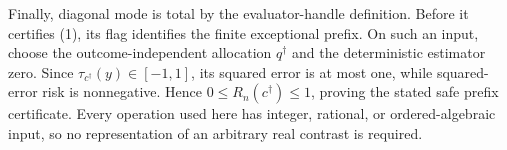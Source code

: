 Finally, diagonal mode is total by the evaluator-handle definition.  Before it certifies (1), its flag identifies the finite exceptional prefix.  On such an input, choose the outcome-independent allocation \(q^\dagger\) and the deterministic estimator zero.  Since \(\tau_{c^\dagger}(y)\in[-1,1]\), its squared error is at most one, while squared-error risk is nonnegative.  Hence \(0\le R_n(c^\dagger)\le1\), proving the stated safe prefix certificate.  Every operation used here has integer, rational, or ordered-algebraic input, so no representation of an arbitrary real contrast is required.
